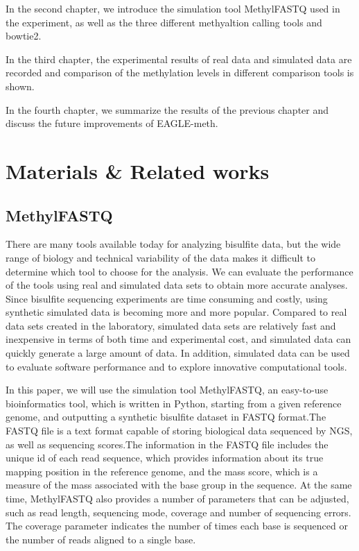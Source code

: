 \documentclass{PHlab-thesis}
\begin{document}
\par 
In the second chapter, we introduce the simulation tool MethylFASTQ used in the experiment, as well as the three different methyaltion calling tools and bowtie2.

\par
In the third chapter, the experimental results of real data and simulated data are recorded and comparison of the methylation levels in different comparison tools is shown.

\par
In the fourth chapter, we summarize the results of the previous chapter and discuss the future improvements of EAGLE-meth.

\chapter{Materials \& Related works}


\section{MethylFASTQ}
There are many tools available today for analyzing bisulfite data, but the wide range of biology and technical variability of the data makes it difficult to determine which tool to choose for the analysis. We can evaluate the performance of the tools using real and simulated data sets to obtain more accurate analyses. Since bisulfite sequencing experiments are time consuming and costly, using synthetic simulated data is becoming more and more popular. Compared to real data sets created in the laboratory, simulated data sets are relatively fast and inexpensive in terms of both time and experimental cost, and simulated data can quickly generate a large amount of data. In addition, simulated data can be used to evaluate software performance and to explore innovative computational tools.

\par
In this paper, we will use the simulation tool MethylFASTQ\cite{piaggeschi2019methylfastq}, an easy-to-use bioinformatics tool, which is written in Python, starting from a given reference genome, and outputting a synthetic bisulfite dataset in FASTQ format.The FASTQ file is a text format capable of storing biological data sequenced by NGS, as well as sequencing scores.The information in the FASTQ file includes the unique id of each read sequence, which provides information about its true mapping position in the reference genome, and the mass score, which is a measure of the mass associated with the base group in the sequence. At the same time, MethylFASTQ also provides a number of parameters that can be adjusted, such as read length, sequencing mode, coverage and number of sequencing errors. The coverage parameter indicates the number of times each base is sequenced or the number of reads aligned to a single base.
\end{document}
